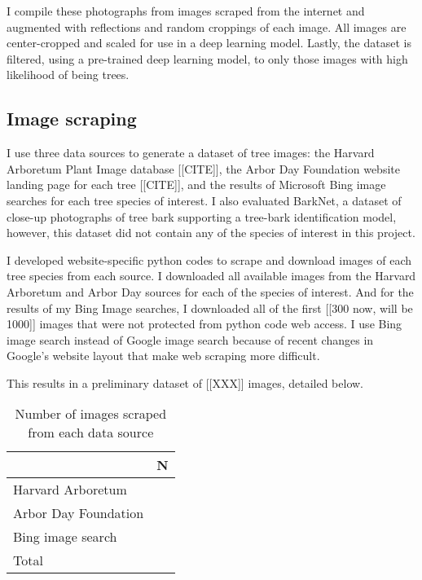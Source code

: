 \documentclass[10pt,twocolumn,letterpaper]{article}
\begin{document}
I compile these photographs from images scraped from the internet and augmented with reflections and random croppings of each image. All images are center-cropped and scaled for use in a deep learning model. Lastly, the dataset is filtered, using a pre-trained deep learning model, to only those images with high likelihood of being trees. 


\subsection{Image scraping}

I use three data sources to generate a dataset of tree images: the Harvard Arboretum Plant Image database [[CITE]], the Arbor Day Foundation website landing page for each tree [[CITE]], and the results of Microsoft Bing image searches for each tree species of interest. I also evaluated BarkNet, a dataset of close-up photographs of tree bark supporting a tree-bark identification model, however, this dataset did not contain any of the species of interest in this project.

I developed website-specific python codes to scrape and download images of each tree species from each source. I downloaded all available images from the Harvard Arboretum and Arbor Day sources for each of the species of interest. And for the results of my Bing Image searches, I downloaded all of the first [[300 now, will be 1000]] images that were not protected from python code web access. I use Bing image search instead of Google image search because of recent changes in Google’s website layout that make web scraping more difficult.

This results in a preliminary dataset of [[XXX]] images, detailed below.

\begin{table}
   \begin{center}
   \begin{tabular}{|l|c|}
   \hline
   & N \\
   \hline\hline
   Harvard Arboretum & \\
   Arbor Day Foundation & \\
   Bing image search & \\
   \hline\hline
   Total & \\
   \hline
   \end{tabular}
   \end{center}
   \caption{Number of images scraped from each data source}
   \end{table}
\end{document}
